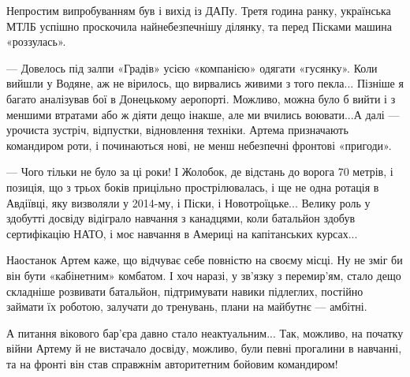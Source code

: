 Непростим випробуванням був і вихід із ДАПу. Третя година ранку, українська
МТЛБ успішно проскочила найнебезпечнішу ділянку, та перед Пісками машина
«роззулась».

— Довелось під залпи «Градів» усією «компанією» одягати «гусянку». Коли вийшли
у Водяне, аж не вірилось, що вирвались живими з того пекла... Пізніше я багато
аналізував бої в Донецькому аеропорті. Можливо, можна було б вийти і з меншими
втратами або ж діяти дещо інакше, але ми вчились воювати...А далі — урочиста
зустріч, відпустки, відновлення техніки. Артема призначають командиром роти, і
починаються нові, не менш небезпечні фронтові «пригоди».

— Чого тільки не було за ці роки! І Жолобок, де відстань до ворога 70 метрів, і
позиція, що з трьох боків прицільно прострілювалась, і ще не одна ротація в
Авдіївці, яку визволяли у 2014-му, і Піски, і Новотроїцьке... Велику роль у
здобутті досвіду відіграло навчання з канадцями, коли батальйон здобув
сертифікацію НАТО, і моє навчання в Америці на капітанських курсах...

Наостанок Артем каже, що відчуває себе повністю на своєму місці. Ну не зміг би
він бути «кабінетним» комбатом. І хоч наразі, у зв’язку з перемир’ям, стало
дещо складніше розвивати батальйон, підтримувати навики підлеглих, постійно
займати їх роботою, залучати до тренувань, плани на майбутнє — амбітні.

А питання вікового бар’єра давно стало неактуальним... Так, можливо, на початку
війни Артему й не вистачало досвіду, можливо, були певні прогалини в навчанні,
та на фронті він став справжнім авторитетним бойовим командиром!
